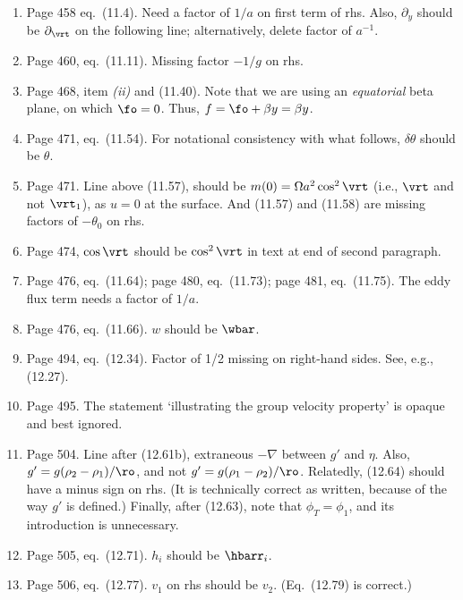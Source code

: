 \documentclass[10pt]{article}
\newcommand{\eq}{eq.\ } \newcommand{\Eq}{Eq.\ }
\begin{document}
\begin{enumerate}
\item Page 458 \eq (11.4). Need a factor of $1/a$ on first term of rhs. Also, $\partial_y$ should be $\partial_\vrt$ on the following line; alternatively, delete factor of $a^{-1}$.

\item Page 460, \eq (11.11). Missing factor $-1/g$ on rhs.

\item Page 468, item \textit{(ii)} and (11.40). Note that we are using an \textit{equatorial} beta plane, on which $\fo=0$. Thus, $f=\fo + \beta y = \beta y$.

\item Page  471, \eq (11.54). For notational consistency with what follows, $\delta \theta$ should be $\theta$. 

\item Page 471. Line above (11.57), should be $m(0) = \Omega a^2 \cos^2 \vrt$ (i.e., $\vrt$ and not $\vrt_1$), as $u=0$ at the surface. And (11.57) and (11.58) are missing factors of $-\theta_0$ on rhs.

\item Page 474, $\cos \vrt$ should be $\cos^2 \vrt$ in text at end of second paragraph.

\item Page 476, \eq (11.64); page 480, \eq (11.73);  page 481, \eq(11.75). The eddy flux term needs a factor of $1/a$.

\item Page 476, \eq (11.66). $w$ should be $\wbar$.

 \item Page 494, \eq (12.34). Factor of 1/2 missing on right-hand sides. See, e.g., (12.27). 

 \item Page 495. The statement `illustrating the group velocity property' is opaque and best ignored. 

\item Page 504. Line after (12.61b), extraneous $-\nabla$ between $g'$ and $\eta$. Also, $g' = g (\rho_2-\rho_1)/\ro$, and not $g' = g (\rho_1-\rho_2)/\ro$. Relatedly, (12.64) should have a minus sign on rhs. (It is technically correct as written, because of the way $g'$ is defined.) Finally, after (12.63), note that $\phi_T = \phi_1$, and its introduction is unnecessary.

\item Page 505, \eq(12.71). $h_i$ should be $\hbarr_i$. 

\item Page 506, \eq (12.77). $v_1$ on rhs should be $v_2$. (Eq.\ (12.79) is correct.) 


\end{enumerate}
\end{document}
